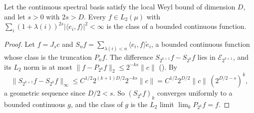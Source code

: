 \begin{theorem}[Continuity of $H^s(M)$]
\label{thm:local-weyl-continuity}
\leanok
{}
Let the continuous spectral basis satisfy the local Weyl bound of dimension $D$, and let
$s > 0$ with $2s > D$. Every $f \in L_2(\mu)$ with
$\sum_i (1 + \lambda(i))^{2s} |\langle e_i, f \rangle|^2 < \infty$ is the class of a bounded
continuous function.
\end{theorem}

\begin{proof}
\leanok
Let $f = J_s c$ and $S_n f = \sum_{\lambda(i) < n} \langle e_i, f \rangle \tilde e_i$, a bounded
continuous function whose class is the truncation $P_n f$. The difference
$S_{2^{k+1}} f - S_{2^k} f$ lies in $\mathcal{E}_{2^{k+1}}$, and its $L_2$ norm is at most
$\|f - P_{2^k} f\|_2 \leq 2^{-ks} \|c\|$ (). By
\[
  \|S_{2^{k+1}} f - S_{2^k} f\|_\infty \leq C^{1/2} 2^{(k+1)D/2} 2^{-ks} \|c\|
  = C^{1/2} 2^{D/2} \|c\| \, (2^{D/2 - s})^k ,
\]
a geometric sequence since $D/2 < s$. So $(S_{2^k} f)_k$ converges uniformly to a bounded
continuous $g$, and the class of $g$ is the $L_2$ limit $\lim_k P_{2^k} f = f$.
\end{proof}
